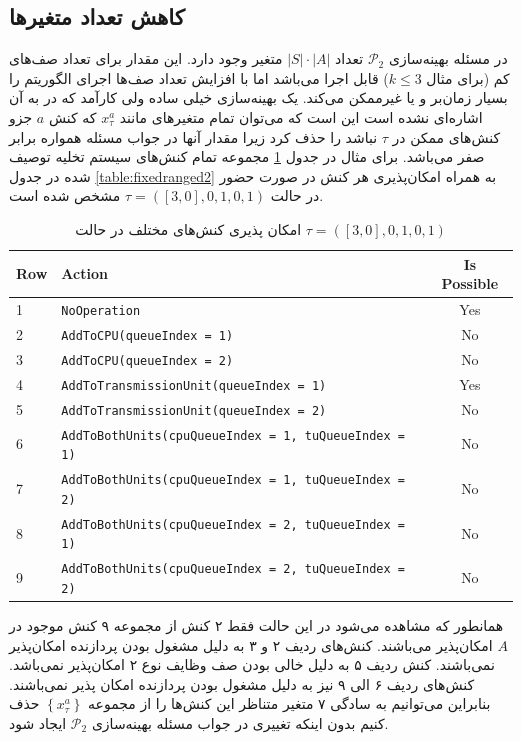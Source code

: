\subsection{کاهش تعداد متغیرها}
\label{sub:reducevariable}
در مسئله بهینه‌سازی 
$\mathcal{P}_2$
تعداد 
$|S| \cdot |A|$
متغیر وجود دارد. این مقدار برای تعداد صف‌های کم (برای مثال $k \leq 3$) قابل اجرا می‌باشد اما با افزایش تعداد صف‌ها اجرای الگوریتم را بسیار زمان‌بر و یا غیرممکن می‌کند. یک بهینه‌سازی خیلی ساده ولی کارآمد که در \cite{Liu} به آن اشاره‌ای نشده است این است که می‌توان تمام متغیرهای مانند
$x_{\tau}^{a}$
که کنش
$a$
جزو کنش‌های ممکن در
$\tau$
نباشد را حذف کرد زیرا مقدار آنها در جواب مسئله همواره برابر صفر می‌باشد. برای مثال در جدول \ref{table:isactionpossible} مجموعه تمام کنش‌های سیستم تخلیه توصیف شده در جدول \ref{table:fixedranged2} به همراه امکان‌پذیری هر کنش در صورت حضور در حالت 
$\tau = ([3, 0], 0, 1, 0, 1)$
مشخص شده است.
\begin{table}
	\centering
	\begin{latin}
\begin{tabular}{llc}
	\hline Row & Action & Is Possible \\
	\hline 
1            & \texttt{\footnotesize NoOperation}                                         & Yes \\
2            & \texttt{\footnotesize AddToCPU(queueIndex = 1)}                            & No \\
3            & \texttt{\footnotesize AddToCPU(queueIndex = 2)}                            & No \\
4            & \texttt{\footnotesize AddToTransmissionUnit(queueIndex = 1)}               & Yes \\
5            & \texttt{\footnotesize AddToTransmissionUnit(queueIndex = 2)}               & No \\
6            & \texttt{\footnotesize AddToBothUnits(cpuQueueIndex = 1, tuQueueIndex = 1)} & No  \\
7            & \texttt{\footnotesize AddToBothUnits(cpuQueueIndex = 1, tuQueueIndex = 2)} & No \\
8            & \texttt{\footnotesize AddToBothUnits(cpuQueueIndex = 2, tuQueueIndex = 1)} &No \\
9            & \texttt{\footnotesize AddToBothUnits(cpuQueueIndex = 2, tuQueueIndex = 2)} &No \\\bottomrule
	\hline
\end{tabular}
	\end{latin}
	\caption{امکان پذیری کنش‌های مختلف در حالت $\tau = ([3, 0], 0, 1, 0, 1)$}
	\label{table:isactionpossible}
\end{table}
همانطور که مشاهده می‌شود در این حالت فقط ۲ کنش از مجموعه ۹ کنش موجود در $A$ امکان‌پذیر می‌باشند. کنش‌های ردیف ۲ و ۳ به دلیل مشغول بودن پردازنده امکان‌پذیر نمی‌باشند. کنش ردیف ۵ به دلیل خالی بودن صف وظایف نوع ۲ امکان‌پذیر نمی‌باشد. کنش‌های ردیف ۶ الی ۹ نیز به دلیل مشغول بودن پردازنده امکان پذیر نمی‌باشند. بنابراین می‌توانیم به سادگی ۷ متغیر متناظر این کنش‌ها را از مجموعه $\left\{x_{\tau}^{a}\right\}$ حذف کنیم بدون اینکه تغییری در جواب مسئله بهینه‌سازی $\mathcal{P}_2$ ایجاد شود.
